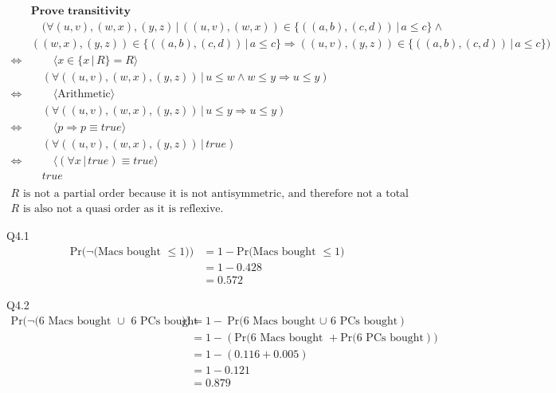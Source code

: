\documentclass{article}
\begin{document}
    \begin{align*}
    & \textbf{Prove transitivity} \\
    & \quad (\forall (u,v),(w,x),(y,z)\,|\, ((u,v),(w,x))\in \{((a,b),(c,d))\,|\, a\leq c\} \land \\
    & ((w,x),(y,z))\in \{((a,b),(c,d))\,|\, a\leq c\} \Longrightarrow ((u,v),(y,z))\in\{((a,b),(c,d))\,|\, a\leq c\}) \\
    \Longleftrightarrow & \qquad \langle x\in\{x\,|\,R\}=R \rangle \\
    & \quad (\forall ((u,v),(w,x),(y,z))\,|\, u\leq w \land w\leq y \Longrightarrow u\leq y) \\
    \Longleftrightarrow & \qquad \langle
\text{Arithmetic} \rangle \\
    & \quad (\forall ((u,v),(w,x),(y,z))\,|\, u\leq y \Longrightarrow u\leq y) \\
    \Longleftrightarrow & \qquad \langle
p\Longrightarrow p \equiv true \rangle \\
    & \quad (\forall ((u,v),(w,x),(y,z))\,|\, true) \\
    \Longleftrightarrow & \qquad \langle (\forall x\,|\, true) \equiv true \rangle \\
    & \quad true \\
    \end{align*}
    \begin{gather*}
        \text{$R$ is not a partial order because it is not antisymmetric, and therefore not a total order either.} \\
        \text{$R$ is also not a quasi order as it is reflexive.}
    \end{gather*}

    \vspace{10mm}
    Q4.1
    \begin{align*}
        \text{Pr($\neg$(Macs bought  } \leq 1)) &= 1 - \text{Pr(Macs bought  } \leq 1) \\
        &= 1 - 0.428 \\
        &= 0.572 
    \end{align*}
    
    Q4.2
    \begin{align*}
        \text{Pr($\neg$(6 Macs bought  $\cup$ 6 PCs bought})) &= 1 - \text{Pr(6 Macs bought  $\cup$ 6 PCs bought}) \\
        &= 1 - (\text{Pr(6 Macs bought } + \text{Pr(6 PCs bought})) \\
        &= 1 - (0.116 + 0.005) \\
        &= 1 - 0.121 \\
        &= 0.879
    \end{align*}
\end{document}
